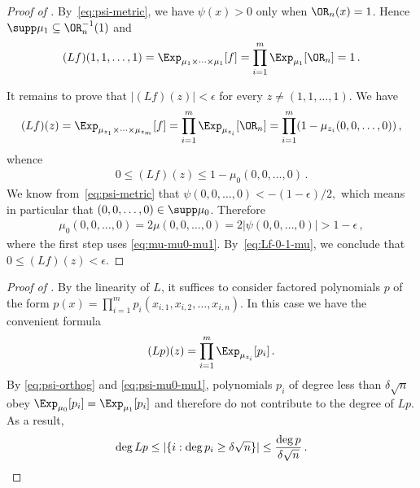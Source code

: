  
\begin{proof}[Proof of ]
By~\eqref{eq:psi-metric}, we have $\psi(x)>0$ only when $\OR_n(x)=1$.
Hence $\supp\mu_1\subseteq\OR_n^{-1}(1)$ and
\begin{align*}
(Lf)(1,1,\dots,1)
   =\Exp_{\mu_1\times\cdots\times\mu_1}[f]
   =\prod_{i=1}^m\Exp_{\mu_1}[\OR_n]=1\,.
\end{align*}
 
 
It remains to prove that $|(Lf)(z)|<\epsilon$ for every $z\ne(1,1,\dots,1)$.
We have
\begin{align*}
(Lf)(z)
  =\Exp_{\mu_{z_1}\times\cdots\times\mu_{z_m}}[f]
  =\prod_{i=1}^m\Exp_{\mu_{z_i}}[\OR_n]
  =\prod_{i=1}^m(1-\mu_{z_i}(0,0,\dots,0))\,,
\end{align*}
whence
\begin{align}
0\leq(Lf)(z)\leq1-\mu_0(0,0,\dots,0)\,.\label{eq:Lf-0-1-mu}
\end{align}
We know from~\eqref{eq:psi-metric} that $\psi(0,0,\dots,0)<-(1-\epsilon)/2,$
which means in particular that $(0,0,\dots,0)\in\supp\mu_0$. Therefore
\begin{align*}
\mu_0(0,0,\dots,0)
  =2\mu(0,0,\dots,0)
  =2|\psi(0,0,\dots,0)|
  >1-\epsilon\,,
\end{align*}
where the first step uses \eqref{eq:mu-mu0-mu1}. By~\eqref{eq:Lf-0-1-mu},
we conclude that $0\leq(Lf)(z)<\epsilon$.
\end{proof}
 
\begin{proof}[Proof of ]
By the linearity of $L$, it suffices to consider factored polynomials
$p$ of the form $p(x)=\prod_{i=1}^mp_i(x_{i,1},x_{i,2},\dots,x_{i,n})$.
In this case we have the convenient formula
\begin{align*}
(Lp)(z)=\prod_{i=1}^m\Exp_{\mu_{z_i}}[p_i]\,.
\end{align*}
By \eqref{eq:psi-orthog} and \eqref{eq:psi-mu0-mu1}, polynomials
$p_i$ of degree less than $\delta\sqrt{n}$ obey 
$\Exp_{\mu_0}[p_i]=\Exp_{\mu_1}[p_i]$
and therefore do not contribute to the degree of $Lp$. As a result,
\[
\deg Lp\leq|\{i:\deg p_i\geq\delta\sqrt{n}\}|
   \leq\frac{\deg p}{\delta\sqrt{n}}\,.\qedhere
\]
\end{proof}
